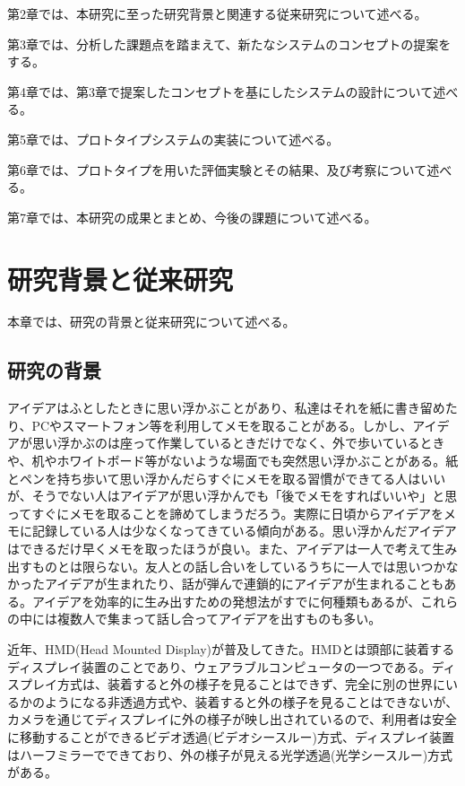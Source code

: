 \documentclass[11pt,a4j, titlepage]{jarticle} %
\begin{document}
第2章では、本研究に至った研究背景と関連する従来研究について述べる。

第3章では、分析した課題点を踏まえて、新たなシステムのコンセプトの提案をする。

第4章では、第3章で提案したコンセプトを基にしたシステムの設計について述べる。

第5章では、プロトタイプシステムの実装について述べる。

第6章では、プロトタイプを用いた評価実験とその結果、及び考察について述べる。

第7章では、本研究の成果とまとめ、今後の課題について述べる。

\newpage
\section{研究背景と従来研究}
本章では、研究の背景と従来研究について述べる。

\subsection{研究の背景}
アイデアはふとしたときに思い浮かぶことがあり、私達はそれを紙に書き留めたり、PCやスマートフォン等を利用してメモを取ることがある。しかし、アイデアが思い浮かぶのは座って作業しているときだけでなく、外で歩いているときや、机やホワイトボード等がないような場面でも突然思い浮かぶことがある。紙とペンを持ち歩いて思い浮かんだらすぐにメモを取る習慣ができてる人はいいが、そうでない人はアイデアが思い浮かんでも「後でメモをすればいいや」と思ってすぐにメモを取ることを諦めてしまうだろう。実際に日頃からアイデアをメモに記録している人は少なくなってきている傾向がある\cite{memo}。思い浮かんだアイデアはできるだけ早くメモを取ったほうが良い。また、アイデアは一人で考えて生み出すものとは限らない。友人との話し合いをしているうちに一人では思いつかなかったアイデアが生まれたり、話が弾んで連鎖的にアイデアが生まれることもある。アイデアを効率的に生み出すための発想法がすでに何種類もあるが、これらの中には複数人で集まって話し合ってアイデアを出すものも多い\cite{hassouhou}。

近年、HMD(Head Mounted Display)が普及してきた。HMDとは頭部に装着するディスプレイ装置のことであり、ウェアラブルコンピュータの一つである。ディスプレイ方式は、装着すると外の様子を見ることはできず、完全に別の世界にいるかのようになる非透過方式や、装着すると外の様子を見ることはできないが、カメラを通じてディスプレイに外の様子が映し出されているので、利用者は安全に移動することができるビデオ透過(ビデオシースルー)方式、ディスプレイ装置はハーフミラーでできており、外の様子が見える光学透過(光学シースルー)方式がある。
\end{document}

